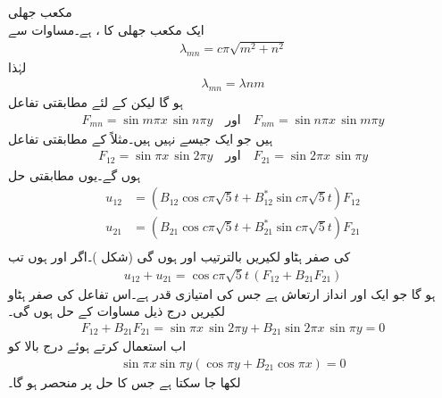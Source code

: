 \quad مکعب جھلی\\
ایک مکعب جھلی کا ،  ہے۔مساوات  سے 
\begin{align}\label{مساوات_جزوی_مثال_مکعب_جھلی_الف}
\lambda_{mn}=c\pi\sqrt{m^2+n^2}
\end{align}
لہٰذا 
\begin{align*}
\lambda_{mn}=\lambda{nm}
\end{align*}
ہو گا لیکن  کے لئے مطابقتی  تفاعل
\begin{align*}
F_{mn}=\sin m\pi x\,\sin n\pi y \quad \text{اور} \quad F_{nm}=\sin n\pi x\,\sin m\pi y
\end{align*}
ہیں جو ایک جیسے نہیں ہیں۔مثلاً  کے مطابقتی تفاعل
\begin{align*}
F_{12}=\sin \pi x\,\sin 2\pi y\quad \text{اور}\quad F_{21}=\sin 2\pi x\,\sin \pi y
\end{align*}
ہوں گے۔یوں مطابقتی حل
\begin{align*}
u_{12}&=(B_{12}\cos c\pi\sqrt{5}t+B^*_{12}\sin c\pi\sqrt{5}t)F_{12}\\
u_{21}&=(B_{21}\cos c\pi\sqrt{5}t+B^*_{21}\sin c\pi\sqrt{5}t)F_{21}\\
\end{align*}
کی صفر ہٹاو لکیریں  بالترتیب  اور  ہوں گی (شکل )۔اگر  اور  ہوں تب
\begin{align*}
u_{12}+u_{21}=\cos c\pi\sqrt{5}t\,(F_{12}+B_{21}F_{21})
\end{align*}
ہو گا جو ایک اور انداز ارتعاش ہے جس کی امتیازی قدر  ہے۔اس تفاعل کی صفر ہٹاو لکیریں درج ذیل مساوات کے حل ہوں گی۔
\begin{align*}
F_{12}+B_{21}F_{21}=\sin \pi x\,\sin 2\pi y+B_{21}\sin 2\pi x\,\sin \pi y=0
\end{align*}
اب  استعمال کرتے ہوئے درج بالا کو 
\begin{align*}
\sin \pi x\sin \pi y(\cos \pi y+B_{21}\cos \pi x)=0
\end{align*}
لکھا جا سکتا ہے جس کا حل  پر منحصر ہو گا۔

